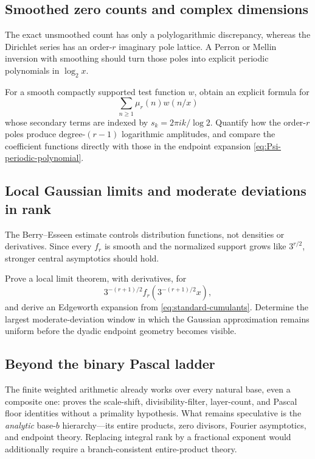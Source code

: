 \documentclass[11pt,a4paper]{article}
\theoremstyle{frontier}
\theoremstyle{definition}
\begin{document}
\subsection{Smoothed zero counts and complex dimensions}

The exact unsmoothed count has only a polylogarithmic discrepancy, whereas the Dirichlet series has an order-$r$ imaginary pole lattice.  A Perron or Mellin inversion with smoothing should turn those poles into explicit periodic polynomials in $\log_2x$.

\begin{frontierproblem}
For a smooth compactly supported test function $w$, obtain an explicit formula for
\[
 \sum_{n\ge1}\mu_r(n)w(n/x)
\]
whose secondary terms are indexed by $s_k=2\pi ik/\log2$.  Quantify how the order-$r$ poles produce degree-$(r-1)$ logarithmic amplitudes, and compare the coefficient functions directly with those in the endpoint expansion \eqref{eq:Psi-periodic-polynomial}.
\end{frontierproblem}

\subsection{Local Gaussian limits and moderate deviations in rank}

The Berry--Esseen estimate controls distribution functions, not densities or derivatives.  Since every $f_r$ is smooth and the normalized support grows like $3^{r/2}$, stronger central asymptotics should hold.

\begin{frontierproblem}
Prove a local limit theorem, with derivatives, for
\[
 3^{-(r+1)/2}f_r\!\left(3^{-(r+1)/2}x\right),
\]
and derive an Edgeworth expansion from \eqref{eq:standard-cumulants}.  Determine the largest moderate-deviation window in which the Gaussian approximation remains uniform before the dyadic endpoint geometry becomes visible.
\end{frontierproblem}

\subsection{Beyond the binary Pascal ladder}

The finite weighted arithmetic already works over every natural base, even a
composite one:  proves the scale-shift,
divisibility-filter, layer-count, and Pascal floor identities without a
primality hypothesis.  What remains speculative is the \emph{analytic}
base-$b$ hierarchy---its entire products, zero divisors, Fourier asymptotics,
and endpoint theory.  Replacing integral rank by a fractional exponent would
additionally require a branch-consistent entire-product theory.
\end{document}
